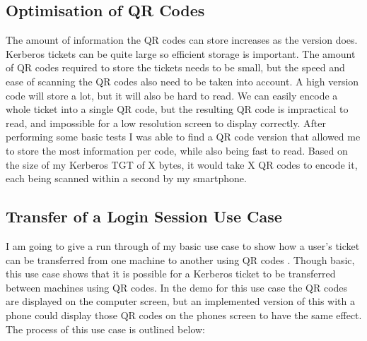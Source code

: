 \documentclass[]{report}   %
\begin{document}
\subsection{Optimisation of QR Codes}
The amount of information the QR codes can store increases as the version does. Kerberos tickets can be quite large so efficient storage is important. The amount of QR codes required to store the tickets needs to be small, but the speed and ease of scanning the QR codes also need to be taken into account. A high version code will store a lot, but it will also be hard to read. We can easily encode a whole ticket into a single QR code, but the resulting QR code is impractical to read, and impossible for a low resolution screen to display correctly. After performing some basic tests I was able to find a QR code version that allowed me to store the most information per code, while also being fast to read. Based on the size of my Kerberos TGT of X bytes, it would take X QR codes to encode it, each being scanned within a second by my smartphone.


\subsection{Transfer of a Login Session Use Case}
I am going to give a run through of my basic use case to show how a user’s ticket can be transferred from one machine to another using QR codes . Though basic, this use case shows that it is possible for a Kerberos ticket to be transferred between machines using QR codes. In the demo for this use case the QR codes are displayed on the computer screen, but an implemented version of this with a phone could display those QR codes on the phones screen to have the same effect. The process of this use case is outlined below:


\end{document}
